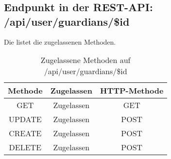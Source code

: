 \subsection{Endpunkt in der REST-API: /api/user/guardians/\$id}
Die  listet die zugelassenen Methoden. 

\begin{table}[!htbp]
	\begin{tabular}{|c|c|c|}
		\hline
			\textbf{Methode} & \textbf{Zugelassen} & \textbf{HTTP-Methode} \\ \hline
			GET & Zugelassen & GET \\ \hline
			UPDATE & Zugelassen & POST \\ \hline 
			CREATE & Zugelassen & POST \\ \hline 
			DELETE & Zugelassen & POST \\ \hline
	\end{tabular}

		\caption{Zugelassene Methoden auf /api/user/guardians/\$id}
		\label{tab:end:rest:api:user:guardians:id:meth}
\end{table}